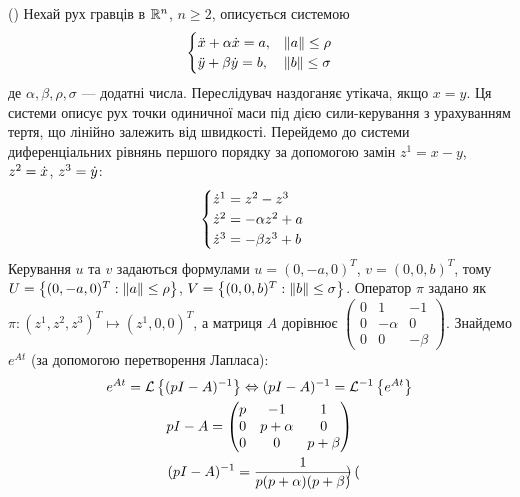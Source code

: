 \begin{example}(\cite{4})\label{ex_4_3}
    Нехай рух гравців в $\mathbb{R}^n$, $n\geq 2$, описується системою
    \begin{gather*}
        \begin{cases}
            \ddot{x} + \alpha \dot{x} = a, & \Vert a \Vert \leq \rho \\
            \ddot{y} + \beta \dot{y} = b, & \Vert b \Vert \leq \sigma
        \end{cases}
    \end{gather*}
    де $\alpha, \beta, \rho, \sigma$ --- додатні числа. Переслідувач наздоганяє утікача, якщо $x=y$.
    Ця системи описує рух точки одиничної маси під дією сили-керування з урахуванням тертя,
    що лінійно залежить від швидкості.
    Перейдемо до системи диференціальних рівнянь першого порядку за допомогою замін $z^1 = x - y$, $z^2 = \dot{x}$, $z^3 = \dot{y}$:
    \begin{gather*}
        \begin{cases}
            \dot{z}^1 = z^2 - z^3 \\
            \dot{z}^2 = -\alpha z^2 + a \\
            \dot{z}^3 = -\beta z^3 + b
        \end{cases}
    \end{gather*}
    Керування $u$ та $v$ задаються формулами $u = (0, -a, 0)^T$, $v = (0, 0, b)^T$, тому
    $U = \left\{(0, -a, 0)^T : \Vert a \Vert \leq \rho \right\}$, $V = \left\{(0, 0, b)^T : \Vert b \Vert \leq \sigma \right\}$.
    Оператор $\pi$ задано як $\pi: (z^1, z^2, z^3)^T \mapsto (z^1, 0, 0)^T$, а матриця $A$
    дорівнює $\begin{pmatrix}
        0 & 1 & -1 \\
        0 & -\alpha & 0 \\
        0 & 0 & -\beta
    \end{pmatrix}$. Знайдемо $e^{A t}$ (за допомогою перетворення Лапласа):
    \begin{gather*}
        e^{At} = \mathcal{L}\left\{(pI - A)^{-1}\right\} \Leftrightarrow (pI - A)^{-1} = \mathcal{L}^{-1}\left\{e^{At}\right\} \\
        pI - A = \begin{pmatrix}
            p & -1 & 1 \\
            0 & p+\alpha & 0 \\
            0 & 0 & p + \beta \\
        \end{pmatrix} \\
        (pI - A)^{-1} = \frac{1}{p(p+\alpha)(p+\beta)}\begin{pmatrix}

\end{pmatrix}
\end{gather*}
\end{example}
